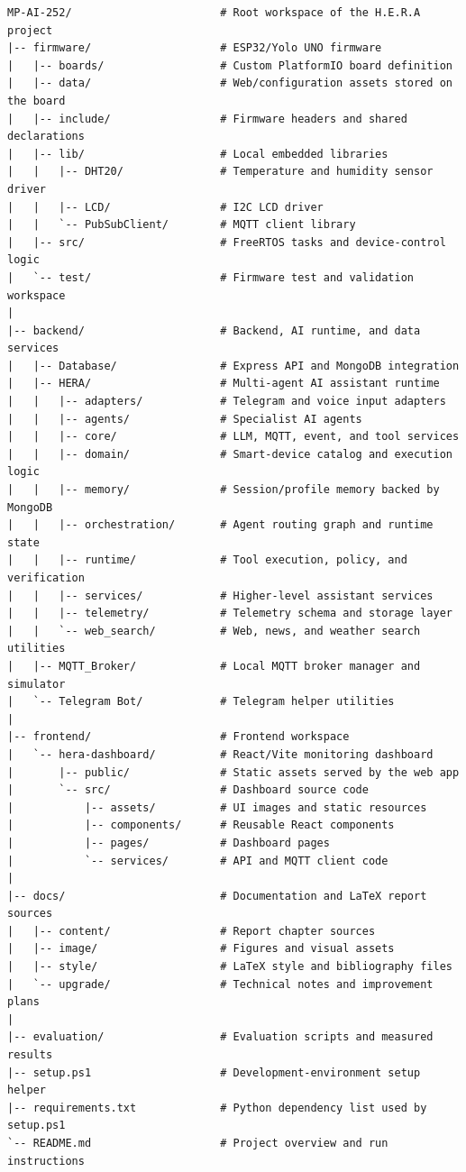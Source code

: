 \begin{lstlisting}[style=projecttree]
MP-AI-252/                       # Root workspace of the H.E.R.A project
|-- firmware/                    # ESP32/Yolo UNO firmware
|   |-- boards/                  # Custom PlatformIO board definition
|   |-- data/                    # Web/configuration assets stored on the board
|   |-- include/                 # Firmware headers and shared declarations
|   |-- lib/                     # Local embedded libraries
|   |   |-- DHT20/               # Temperature and humidity sensor driver
|   |   |-- LCD/                 # I2C LCD driver
|   |   `-- PubSubClient/        # MQTT client library
|   |-- src/                     # FreeRTOS tasks and device-control logic
|   `-- test/                    # Firmware test and validation workspace
|
|-- backend/                     # Backend, AI runtime, and data services
|   |-- Database/                # Express API and MongoDB integration
|   |-- HERA/                    # Multi-agent AI assistant runtime
|   |   |-- adapters/            # Telegram and voice input adapters
|   |   |-- agents/              # Specialist AI agents
|   |   |-- core/                # LLM, MQTT, event, and tool services
|   |   |-- domain/              # Smart-device catalog and execution logic
|   |   |-- memory/              # Session/profile memory backed by MongoDB
|   |   |-- orchestration/       # Agent routing graph and runtime state
|   |   |-- runtime/             # Tool execution, policy, and verification
|   |   |-- services/            # Higher-level assistant services
|   |   |-- telemetry/           # Telemetry schema and storage layer
|   |   `-- web_search/          # Web, news, and weather search utilities
|   |-- MQTT_Broker/             # Local MQTT broker manager and simulator
|   `-- Telegram Bot/            # Telegram helper utilities
|
|-- frontend/                    # Frontend workspace
|   `-- hera-dashboard/          # React/Vite monitoring dashboard
|       |-- public/              # Static assets served by the web app
|       `-- src/                 # Dashboard source code
|           |-- assets/          # UI images and static resources
|           |-- components/      # Reusable React components
|           |-- pages/           # Dashboard pages
|           `-- services/        # API and MQTT client code
|
|-- docs/                        # Documentation and LaTeX report sources
|   |-- content/                 # Report chapter sources
|   |-- image/                   # Figures and visual assets
|   |-- style/                   # LaTeX style and bibliography files
|   `-- upgrade/                 # Technical notes and improvement plans
|
|-- evaluation/                  # Evaluation scripts and measured results
|-- setup.ps1                    # Development-environment setup helper
|-- requirements.txt             # Python dependency list used by setup.ps1
`-- README.md                    # Project overview and run instructions
\end{lstlisting}


